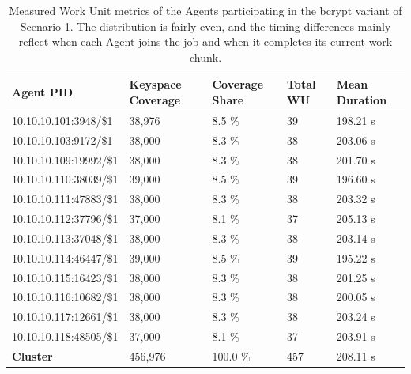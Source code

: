 \begin{table}[H]
    \centering
    \caption{Measured Work Unit metrics of the Agents participating in the bcrypt variant of Scenario 1. The distribution is fairly even, and the timing differences mainly reflect when each Agent joins the job and when it completes its current work chunk.}
    \label{tab:scenario1_bcrypt_work_units}
    \footnotesize
    \begin{tabular}{|l|l|l|l|l|}
        \hline
         \textbf{Agent PID} & \textbf{Keyspace Coverage} & \textbf{Coverage Share} & \textbf{Total WU} & \textbf{Mean Duration} \\ \hline
         10.10.10.101:3948/\$1 & 38,976 & 8.5 \% & 39 & 198.21 s \\ \hline
         10.10.10.103:9172/\$1 & 38,000 & 8.3 \% & 38 & 203.06 s \\ \hline
         10.10.10.109:19992/\$1 & 38,000 & 8.3 \% & 38 & 201.70 s \\ \hline
         10.10.10.110:38039/\$1 & 39,000 & 8.5 \% & 39 & 196.60 s \\ \hline
         10.10.10.111:47883/\$1 & 38,000 & 8.3 \% & 38 & 203.32 s \\ \hline
         10.10.10.112:37796/\$1 & 37,000 & 8.1 \% & 37 & 205.13 s \\ \hline
         10.10.10.113:37048/\$1 & 38,000 & 8.3 \% & 38 & 203.14 s \\ \hline
         10.10.10.114:46447/\$1 & 39,000 & 8.5 \% & 39 & 195.22 s \\ \hline
         10.10.10.115:16423/\$1 & 38,000 & 8.3 \% & 38 & 201.25 s \\ \hline
         10.10.10.116:10682/\$1 & 38,000 & 8.3 \% & 38 & 200.05 s \\ \hline
         10.10.10.117:12661/\$1 & 38,000 & 8.3 \% & 38 & 203.24 s \\ \hline
         10.10.10.118:48505/\$1 & 37,000 & 8.1 \% & 37 & 203.91 s \\ \hline
        \textbf{Cluster} & 456,976 & 100.0 \% & 457 & 208.11 s \\ \hline
    \end{tabular}
\end{table}

